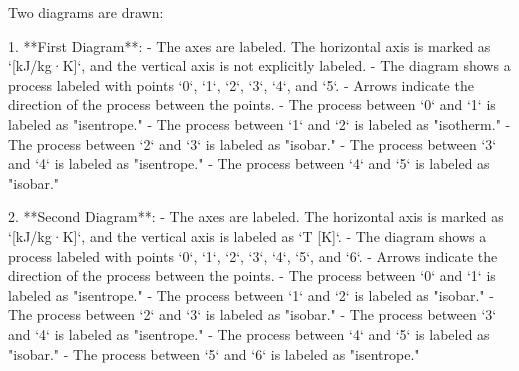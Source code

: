 Two diagrams are drawn:

1. **First Diagram**:  
   - The axes are labeled. The horizontal axis is marked as `[kJ/kg·K]`, and the vertical axis is not explicitly labeled.  
   - The diagram shows a process labeled with points `0`, `1`, `2`, `3`, `4`, and `5`.  
   - Arrows indicate the direction of the process between the points.  
   - The process between `0` and `1` is labeled as "isentrope."  
   - The process between `1` and `2` is labeled as "isotherm."  
   - The process between `2` and `3` is labeled as "isobar."  
   - The process between `3` and `4` is labeled as "isentrope."  
   - The process between `4` and `5` is labeled as "isobar."  

2. **Second Diagram**:  
   - The axes are labeled. The horizontal axis is marked as `[kJ/kg·K]`, and the vertical axis is labeled as `T [K]`.  
   - The diagram shows a process labeled with points `0`, `1`, `2`, `3`, `4`, `5`, and `6`.  
   - Arrows indicate the direction of the process between the points.  
   - The process between `0` and `1` is labeled as "isentrope."  
   - The process between `1` and `2` is labeled as "isobar."  
   - The process between `2` and `3` is labeled as "isobar."  
   - The process between `3` and `4` is labeled as "isentrope."  
   - The process between `4` and `5` is labeled as "isobar."  
   - The process between `5` and `6` is labeled as "isentrope."